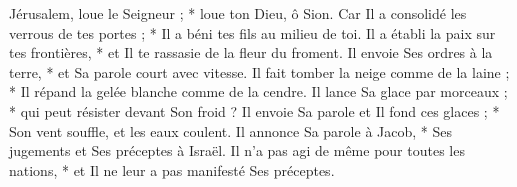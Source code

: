  Jérusalem, loue le Seigneur ; * loue ton Dieu, ô Sion.
\versseparator
 Car Il a consolidé les verrous de tes portes ; * Il a béni tes fils au milieu de toi.
\versseparator
 Il a établi la paix sur tes frontières, * et Il te rassasie de la fleur du froment.
\versseparator
 Il envoie Ses ordres à la terre, * et Sa parole court avec vitesse.
\versseparator
 Il fait tomber la neige comme de la laine ; * Il répand la gelée blanche comme de la cendre.
\versseparator
 Il lance Sa glace par morceaux ; * qui peut résister devant Son froid ?
\versseparator
 Il envoie Sa parole et Il fond ces glaces ; * Son vent souffle, et les eaux coulent.
\versseparator
 Il annonce Sa parole à Jacob, * Ses jugements et Ses préceptes à Israël.
\versseparator
 Il n'a pas agi de même pour toutes les nations, * et Il ne leur a pas manifesté Ses préceptes.